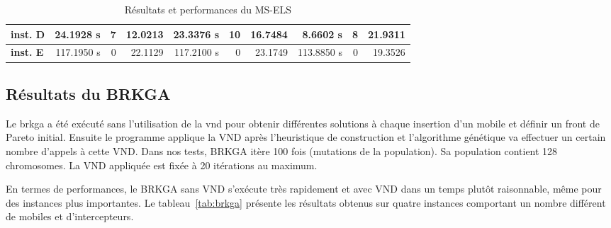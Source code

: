 \begin{table}[H]
\begin{tabular}{l|r|r|r|r|r|r|r|r|r|}
                \multicolumn{1}{|l|}{\textbf{inst. D}} & 24.1928 s                           & 7                                             & 12.0213                                         & 23.3376 s                           & 10                                            & 16.7484                                         & 8.6602 s                            & 8                                            & 21.9311                                         \\ \hline
                \multicolumn{1}{|l|}{\textbf{inst. E}} & 117.1950 s                           & 0                                             & 22.1129                                         & 117.2100 s                           & 0                                             & 23.1749                                         & 113.8850 s                           & 0                                             & 19.3526                                         \\ \hline
                \end{tabular}
                \caption{Résultats et performances du MS-ELS}
                \label{tab:msels}
            \end{table} 

        \subsection{Résultats du BRKGA}
			
			Le \acrlong{brkga} a été exécuté sans l'utilisation de la \acrshort{vnd} pour obtenir différentes solutions à chaque insertion d'un mobile et définir un front de Pareto initial. Ensuite le programme applique la VND après l'heuristique de construction et l'algorithme génétique va effectuer un certain nombre d'appels à cette VND. Dans nos tests, BRKGA itère 100 fois (mutations de la population). Sa population contient 128 chromosomes. La VND appliquée est fixée à 20 itérations au maximum.
			
			En termes de performances, le BRKGA sans VND s'exécute très rapidement et avec VND dans un temps plutôt raisonnable, même pour des instances plus importantes. Le tableau~\ref{tab:brkga} présente les résultats obtenus sur quatre instances comportant un nombre différent de mobiles et d'intercepteurs.
			
